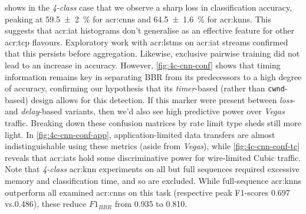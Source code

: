  shows in the \emph{4-class} case that we observe a sharp loss in classification accuracy, peaking at \qty[uncertainty-mode=separate]{59.5 +- 2}{\percent} for \glspl{acr:cnn} and \qty[uncertainty-mode=separate]{64.5 +- 1.6}{\percent} for \glspl{acr:knn}.
This suggests that \gls{acr:iat} histograms don't generalise as an effective feature for other \gls{acr:tcp} flavours.
Exploratory work with \glspl{acr:lstm} on \gls{acr:iat} streams confirmed that this persists before aggregation.
Likewise, exclusive pairwise training did not lead to an increase in accuracy.
However, \cref{fig:4c-cnn-conf} shows that timing information remains key in separating BBR from its predecessors to a high degree of accuracy, confirming our hypothesis that its \emph{timer}-based (rather than \texttt{cwnd}-based) design allows for this detection.
If this marker were present between \emph{loss}- and \emph{delay}-based variants, then we'd also see high predictive power over \emph{Vegas} traffic.
Breaking down these confusion matrices by rate limit type sheds still more light.
In \cref{fig:4c-cnn-conf-app}, application-limited data transfers are almost indistinguishable using these metrics (aside from \emph{Vegas}), while \cref{fig:4c-cnn-conf-tc} reveals that \glspl{acr:iat} hold some discriminative power for wire-limited Cubic traffic.
Note that \emph{4-class} \gls{acr:knn} experiments on all but full sequences required excessive memory and classification time, and so are excluded.
While full-sequence \glspl{acr:knn} outperform all examined \glspl{acr:cnn} on this task (respective peak F1-scores \num{0.697} vs.\@ \num{0.486}), these reduce $\mathit{F1}_\mathit{BBR}$ from \num{0.935} to \num{0.810}.

